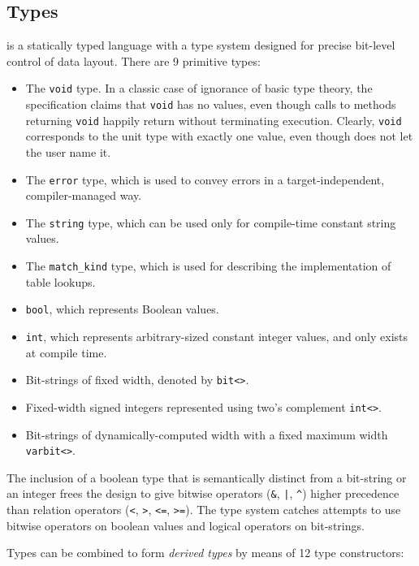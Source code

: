 \subsection*{Types}

\pfs is a statically typed language with a type system designed for precise
bit-level control of data layout. There are 9 primitive types:

\begin{itemize}
	\item The \texttt{void} type. In a classic case of ignorance of basic type
	theory, the specification claims that \texttt{void} has no values, even
	though calls to methods returning \texttt{void} happily return without
	terminating execution. Clearly, \texttt{void} corresponds to the unit type
	with exactly one value, even though \pfs does not let the user name it.
	\item The \texttt{error} type, which is used to convey errors in a
	target-independent, compiler-managed way.
	\item The \texttt{string} type, which can be used only for compile-time
	constant string values.
	\item The \texttt{match\_kind} type, which is used for describing the
	implementation of table lookups.
	\item \texttt{bool}, which represents Boolean values.
	\item \texttt{int}, which represents arbitrary-sized constant integer
	values, and only exists at compile time.
	\item Bit-strings of fixed width, denoted by \texttt{bit<>}.
	\item Fixed-width signed integers represented using two's complement
	\texttt{int<>}.
	\item Bit-strings of dynamically-computed width with a fixed maximum width
	\texttt{varbit<>}.
\end{itemize}

The inclusion of a boolean type that is semantically distinct from a bit-string
or an integer frees the design to give bitwise operators (\texttt{\&},
\texttt{|}, \texttt{\^}) higher precedence than relation operators (\texttt{<},
\texttt{>}, \texttt{<=}, \texttt{>=}). The type system catches attempts to use
bitwise operators on boolean values and logical operators on bit-strings.

Types can be combined to form \emph{derived types} by means of 12 type
constructors:

